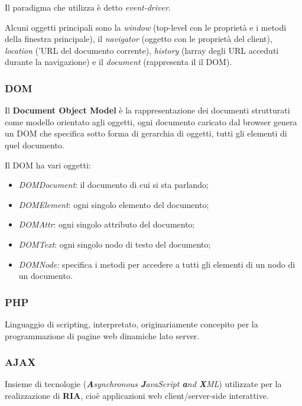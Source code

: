 Il paradigma che utilizza è detto \emph{event-driver}.

Alcuni oggetti principali sono la \emph{window} (top-level con le
proprietà e i metodi della finestra principale), il \emph{navigator}
(oggetto con le proprietà del client), \emph{location} ('URL del
documento corrente), \emph{history} (l\textquotesingle array degli URL
acceduti durante la navigazione) e il \emph{document} (rappresenta il il
DOM).

\subsubsection{DOM}\label{dom}

Il \textbf{Document Object Model} è la rappresentazione dei documenti
strutturati come modello orientato agli oggetti, ogni documento caricato
dal browser genera un DOM che specifica sotto forma di gerarchia di
oggetti, tutti gli elementi di quel documento.

Il DOM ha vari oggetti:

\begin{itemize}
\item
  \emph{DOMDocument}: il documento di cui si sta parlando;
\item
  \emph{DOMElement}: ogni singolo elemento del documento;
\item
  \emph{DOMAttr}: ogni singolo attributo del documento;
\item
  \emph{DOMText}: ogni singolo nodo di testo del documento;
\item
  \emph{DOMNode:} specifica i metodi per accedere a tutti gli elementi
  di un nodo di un documento.
\end{itemize}

\subsubsection{PHP}\label{php}

Linguaggio di scripting, interpretato, originariamente concepito per la
programmazione di pagine web dinamiche lato server.

\subsubsection{AJAX}\label{ajax}

Insieme di tecnologie (\emph{\textbf{A}synchronous \textbf{J}avaScript
\textbf{a}nd \textbf{X}ML}) utilizzate per la realizzazione di
\textbf{RIA}, cioè applicazioni web client/server-side interattive.

